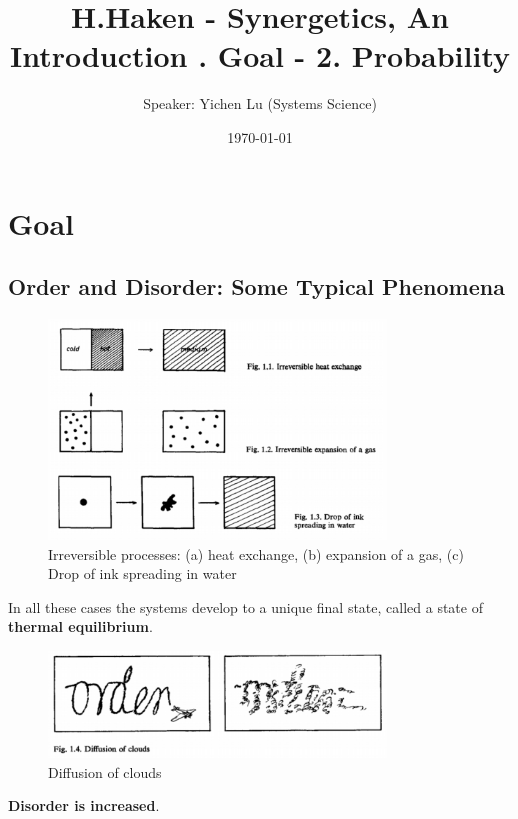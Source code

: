 \documentclass[10pt,aspectratio=43,mathserif,table]{beamer}
\title{H.Haken - Synergetics, An Introduction \newline 1. Goal - 2. Probability}
\author{Speaker: Yichen Lu (Systems Science)\quad \newline  \newline \quad }
\institute{School of Mathematical Science}
\date{\today}
\begin{document}

\frame{\titlepage}
\section{Goal}
\subsection{Order and Disorder: Some Typical Phenomena}
\begin{frame}
    \begin{figure}
        \centering
        \includegraphics[width=0.8\textwidth]{fig/fig1.1-1.3.png}
        \caption{Irreversible processes: (a) heat exchange, (b) expansion of a gas, (c) Drop of ink
        spreading in water}
    \end{figure}
\end{frame}

\begin{frame}
    In all these cases the systems develop to a unique final state, called a state of \textbf{thermal equilibrium}.
    
    \begin{figure}
        \centering
        \includegraphics[width=0.8\textwidth]{fig/fig1.4.png}
        \caption{Diffusion of clouds}
    \end{figure}

    \textbf{Disorder is increased}.

\end{frame}
\end{document}
